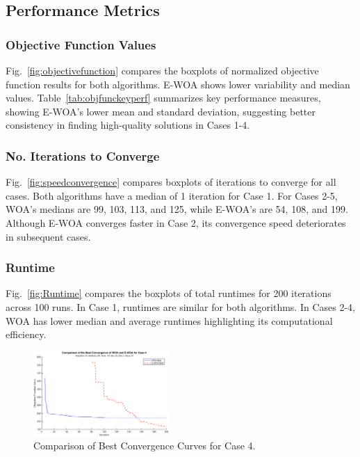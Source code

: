 \documentclass[conference]{IEEEtran}
\begin{document}
\subsection{Performance Metrics}

\subsubsection{Objective Function Values}
Fig.~\ref{fig:objectivefunction} compares the boxplots of normalized objective function results for both algorithms. E-WOA shows lower variability and median values. Table~\ref{tab:objfunckeyperf} summarizes key performance measures, showing E-WOA's lower mean and standard deviation, suggesting better consistency in finding high-quality solutions in Cases 1-4.

\subsubsection{No. Iterations to Converge}
Fig.~\ref{fig:speedconvergence} compares boxplots of iterations to converge for all cases. Both algorithms have a median of 1 iteration for Case 1. For Cases 2-5, WOA's medians are 99, 103, 113, and 125, while E-WOA's are 54, 108, and 199. Although E-WOA converges faster in Case 2, its convergence speed deteriorates in subsequent cases.

\subsubsection{Runtime}
Fig.~\ref{fig:Runtime} compares the boxplots of total runtimes for 200 iterations across 100 runs. In Case 1, runtimes are similar for both algorithms. In Cases 2-4, WOA has lower median and average runtimes highlighting its computational efficiency.




\begin{figure}[htbp]
	\centerline{\includegraphics[width=0.46\textwidth]{convergencecurve.png}}
	\vspace{-5pt}
	\caption{Comparison of Best Convergence Curves for Case 4.}
	\vspace{-10pt}
	\label{fig:convergencecurve}
\end{figure}
\end{document}
